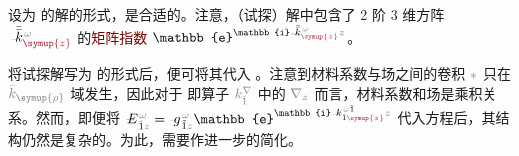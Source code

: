 设为  的解的形式，是合适的\cite{xieAnalytic3DVector}。注意，（试探）解中包含了 2 阶 3 维方阵 $\Xint{\begin{smallmatrix} ~ \\ {}^{}_{\mathcolor{gray}{-}} \\ ~ \end{smallmatrix}}{15}{\bar{\bar{k}}}_{\textcolor{Maroon}{\symup{z}}}^{\;\! \mathcolor{gray}{\omega}}$ 的\textcolor{Maroon}{矩阵指数} $\mathbb{e}^{\mathbb{i} \Xint{{}^{}_{\mathcolor{gray}{-}}}{10}{\bar{\bar{k}}}_{\textcolor{Maroon}{\symup{z}}}^{\;\! \mathcolor{gray}{\omega}} \mathcolor{gray}{z}}$\cite{pessoaAvoidingMatrixExponentials2024,molerNineteenDubiousWays2003}。

将试探解写为  的形式后，便可将其代入 。注意到材料系数与场之间的卷积 $\mathcolor{gray}{*}$ 只在 $\mathcolor{gray}{\bar{k}_{\symup{\rho}}}$ 域发生，因此对于  即算子 $\mathcolor{gray}{k^\nabla_{\check{1}}}$ 中的 $\mathcolor{gray}{\nabla_z}$ 而言，材料系数和场是乘积关系。然而，即便将 $\Xint{\mathcolor{gray}{-}}{25}{E}^{\;\!\mathcolor{gray}{\omega}}_{\;\! \hat{1} \mathcolor{gray}{z}} = \Xint{{}^{}_{\mathcolor{gray}{-}}}{10}{g}^{\;\!\mathcolor{gray}{\omega}}_{\;\! \tilde{1} \mathcolor{gray}{z}} \mathbb{e}^{\mathbb{i} \Xint{{}^{}_{\mathcolor{gray}{-}}}{10}{k}_{\hat{1} \textcolor{Maroon}{\symup{z}}}^{\;\! \mathcolor{gray}{\omega} \tilde{1}} \mathcolor{gray}{z}}$ 代入方程后，其结构仍然是复杂的。为此，需要作进一步的简化。

